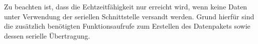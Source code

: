 Zu beachten ist, dass die Echtzeitfähigkeit nur erreicht wird, wenn keine Daten unter Verwendung der seriellen Schnittstelle versandt werden. Grund hierfür sind die zusätzlich benötigten Funktionsaufrufe zum Erstellen des Datenpakets sowie dessen serielle Übertragung.








